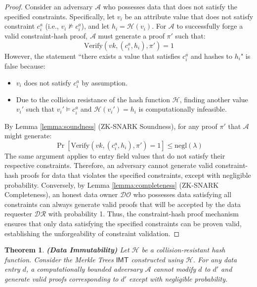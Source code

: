 \documentclass[journal]{IEEEtran}
\newtheorem{theorem}{Theorem}
\begin{document}
\begin{proof}
    Consider an adversary $\mathcal{A}$ who possesses data that does not satisfy the specified constraints. Specifically, let $v_i$ be an attribute value that does not satisfy constraint $c_i^a$ (i.e., $v_i \not\models c_i^a$), and let $h_i = \mathcal{H}(v_i)$. For $\mathcal{A}$ to successfully forge a valid constraint-hash proof, $\mathcal{A}$ must generate a proof $\pi'$ such that:
    $$
        \text{Verify}(vk, (c_i^a, h_i), \pi') = 1
    $$
    However, the statement ``there exists a value that satisfies $c_i^a$ and hashes to $h_i$" is false because:
    \begin{itemize}
        \item $v_i$ does not satisfy $c_i^a$ by assumption.
        \item Due to the collision resistance of the hash function $\mathcal{H}$, finding another value $v_i'$ such that $v_i' \models c_i^a$ and $\mathcal{H}(v_i') = h_i$ is computationally infeasible.
    \end{itemize}
    By Lemma \ref{lemma:soundness} (ZK-SNARK Soundness), for any proof $\pi'$ that $\mathcal{A}$ might generate:
    $$
        \Pr[\text{Verify}(vk, (c_i^a, h_i), \pi') = 1] \leq \text{negl}(\lambda)
    $$
    The same argument applies to entry field values that do not satisfy their respective constraints. Therefore, an adversary cannot generate valid constraint-hash proofs for data that violates the specified constraints, except with negligible probability. Conversely, by Lemma \ref{lemma:completeness} (ZK-SNARK Completeness), an honest data owner $\mathcal{DO}$ who possesses data satisfying all constraints can always generate valid proofs that will be accepted by the data requester $\mathcal{DR}$ with probability 1. Thus, the constraint-hash proof mechanism ensures that only data satisfying the specified constraints can be proven valid, establishing the unforgeability of constraint validation.
\end{proof}

\begin{theorem}
    \textbf{(Data Immutability)} 
    Let $\mathcal{H}$ be a collision-resistant hash function. Consider the Merkle Trees $\mathsf{IMT}$ constructed using $\mathcal{H}$. For any data entry $d$, a computationally bounded adversary $\mathcal{A}$ cannot modify $d$ to $d'$ and generate valid proofs corresponding to $d'$ except with negligible probability.
\end{theorem}
\end{document}
